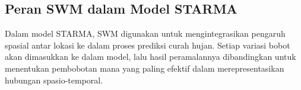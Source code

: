 \subsection{Peran SWM dalam Model STARMA}
Dalam model STARMA, SWM digunakan untuk mengintegrasikan pengaruh spasial antar lokasi ke dalam proses prediksi curah hujan. Setiap variasi bobot akan dimasukkan ke dalam model, lalu hasil peramalannya dibandingkan untuk menentukan pembobotan mana yang paling efektif dalam merepresentasikan hubungan spasio-temporal.